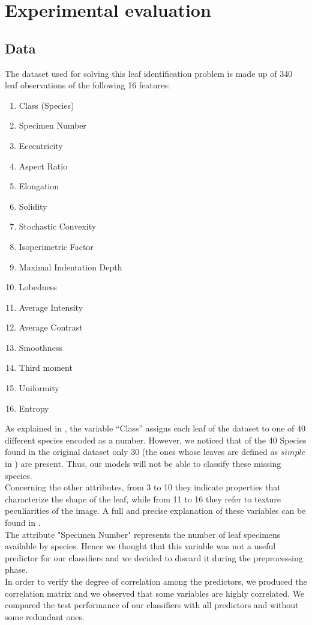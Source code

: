 \documentclass{article}
\begin{document}
\section{Experimental evaluation}

\subsection{Data}\label{dat}
The dataset used for solving this leaf identification problem is made up of 340 leaf observations of the following 16 features:
\begin{multicols}{4}
	\begin{enumerate}
		\item Class (Species)
		\item Specimen Number
		\item Eccentricity
		\item Aspect Ratio
		\item Elongation
		\item Solidity
		\item Stochastic Convexity
		\item Isoperimetric Factor
		\item Maximal Indentation Depth
		\item Lobedness
		\item Average Intensity
		\item Average Contrast
		\item Smoothness
		\item Third moment
		\item Uniformity
		\item Entropy
	\end{enumerate}
\end{multicols}
\noindent As explained in \cite{silva}, the variable “Class”  assigns each leaf of the dataset to one of $40$ different species encoded as a number. However, we noticed that  of the 40 Species found in the original dataset only 30 (the ones whose leaves are defined as $\textit{simple}$ in \cite{silva}) are present.
Thus, our models will not be able to classify these missing species.
\\ Concerning the other attributes, from 3 to 10 they indicate properties that characterize the shape of the leaf, while from 11 to 16 they refer to texture peculiarities of the image. A full and precise explanation of these variables can be found in \cite{silva}.
\\The attribute "Specimen Number" represents the number of leaf specimens available by species. Hence we thought that this variable was not a useful predictor for our classifiers and we decided to discard it during the preprocessing phase.
\\In order to verify the degree of correlation among the predictors, we produced the correlation matrix and we observed that some variables are highly correlated. We compared the test performance of our classifiers with all predictors and without some redundant ones.
\end{document}
